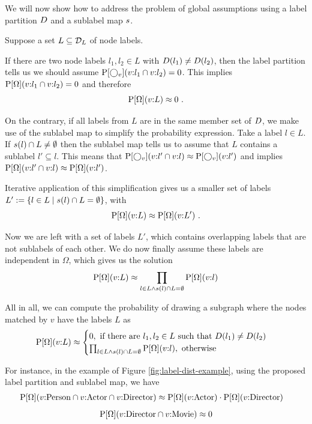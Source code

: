 We will now show how to address the problem of global assumptions using a label
partition $D$ and a sublabel map $s$.

Suppose a set $L \subseteq \mathcal{D}_L$ of node labels.

If there are two node labels $l_1, l_2 \in L$ with
$D(l_1) \not = D(l_2)$, then the label partition tells us we should
assume $\operatorname{P}[\bigcirc_{v}](v{:}l_1 \cap v{:}l_2) = 0$. This implies
$\operatorname{P}[\Omega](v{:}l_1 \cap v{:}l_2) = 0$ and therefore
\[
  \operatorname{P}[\Omega](v{:}L) \approx 0 ~\text{.}
\]

On the contrary, if all labels from $L$ are in the same member set of $D$,
we make use of the sublabel map to simplify the probability expression.
Take a label $l \in L$. If $s(l) \cap L \not = \emptyset$ then the sublabel
map tells us to assume that $L$ contains a sublabel $l' \subseteq l$.
This means that
$\operatorname{P}[\bigcirc_{v}](v{:}l' \cap v{:}l) \approx \operatorname{P}[\bigcirc_{v}](v{:}l')$
and implies
$\operatorname{P}[\Omega](v{:}l' \cap v{:}l) \approx \operatorname{P}[\Omega](v{:}l')$.

Iterative application of this simplification gives us a smaller set of labels
$L' := \{ l \in L \mid s(l) \cap L = \emptyset \}$, with
\[
  \operatorname{P}[\Omega](v{:}L) \approx \operatorname{P}[\Omega](v{:}L') ~\text{.}
\]

Now we are left with a set of labels $L'$, which contains overlapping labels
that are not sublabels of each other.
We do now finally assume these labels are independent in $\Omega$, which
gives us the solution
\[
  \operatorname{P}[\Omega](v{:}L) \approx \prod_{l \in L \land s(l) \cap L = \emptyset}
                                 \operatorname{P}[\Omega](v{:}l)
\]

All in all, we can compute the probability of drawing a subgraph where the
nodes matched by $v$ have the labels $L$ as
\begin{align}
  \operatorname{P}[\Omega](v{:}L) \approx
                         \begin{cases}
                           0, \text{ if there are } l_1, l_2 \in L
                              \text{ such that } D(l_1) \not = D(l_2) \\
                           \prod_{l \in L \land s(l) \cap L = \emptyset}
                             \operatorname{P}[\Omega](v{:}l), \text{ otherwise}
                         \end{cases}
\end{align}

For instance, in the example of Figure \ref{fig:label-dist-example}, using the
proposed label partition and sublabel map, we have
\begin{align*}
  \operatorname{P}[\Omega](v{:}\text{Person} \cap v{:}\text{Actor}
                \cap v{:}\text{Director})
    &\approx \operatorname{P}[\Omega](v{:}\text{Actor})
             \cdot \operatorname{P}[\Omega](v{:}\text{Director})
\end{align*}
\[
  \operatorname{P}[\Omega](v{:}\text{Director} \cap v{:}\text{Movie}) \approx 0
\]
